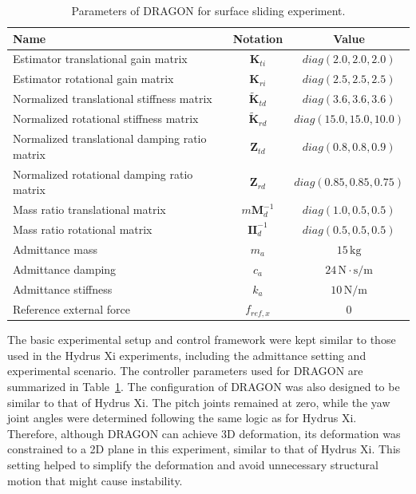 \begin{table}[H]
    \centering
    \caption{Parameters of DRAGON for surface sliding experiment.}
    \label{tb:params5}
    \begin{tabular}{lcc}
        \hline
        Name & Notation & Value \\
        \hline
        Estimator translational gain matrix & $\boldsymbol{K}_{ti}$ & $diag(2.0, 2.0, 2.0)$ \\
        Estimator rotational gain matrix & $\boldsymbol{K}_{ri}$ & $diag(2.5, 2.5, 2.5)$ \\
        Normalized translational stiffness matrix & $\tilde{\boldsymbol{K}}_{td}$ & $diag(3.6, 3.6, 3.6)$ \\
        Normalized rotational stiffness matrix & $\tilde{\boldsymbol{K}}_{rd}$ & $diag(15.0, 15.0, 10.0)$ \\
        Normalized translational damping ratio matrix & $\boldsymbol{Z}_{td}$ & $diag(0.8, 0.8, 0.9)$ \\
        Normalized rotational damping ratio matrix  & $\boldsymbol{Z}_{rd}$ & $diag(0.85, 0.85, 0.75)$ \\
        Mass ratio translational matrix & $m\boldsymbol{M}_d^{-1}$ & $diag(1.0, 0.5, 0.5)$ \\
        Mass ratio rotational matrix & $\boldsymbol{I}\boldsymbol{I}_d^{-1}$ & $diag(0.5, 0.5, 0.5)$ \\
        Admittance mass & $m_a$ & $15\,\mathrm{kg}$ \\
        Admittance damping & $c_a$ & $24\,\mathrm{N\cdot s/m}$ \\
        Admittance stiffness & $k_a$ & $10\,\mathrm{N/m}$ \\
        Reference external force & $f_{ref,x}$ & $0$ \\
        \hline
    \end{tabular}
\end{table}

The basic experimental setup and control framework were kept similar to those used in the Hydrus Xi experiments, including the admittance setting and experimental scenario. The controller parameters used for DRAGON are summarized in Table~\ref{tb:params5}. The configuration of DRAGON was also designed to be similar to that of Hydrus Xi. The pitch joints remained at zero, while the yaw joint angles were determined following the same logic as for Hydrus Xi. Therefore, although DRAGON can achieve 3D deformation, its deformation was constrained to a 2D plane in this experiment, similar to that of Hydrus Xi. This setting helped to simplify the deformation and avoid unnecessary structural motion that might cause instability.

